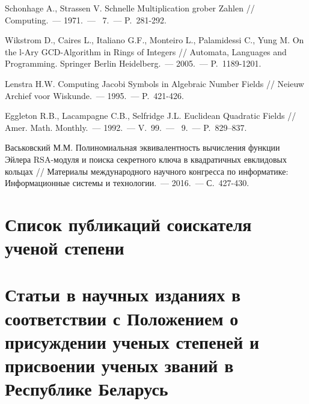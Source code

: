 \documentclass[_00_dissertation.tex]{subfiles}
\begin{document}
\begin{thebibliography}{99}
    Schonhage A., Strassen V. Schnelle Multiplication grober Zahlen // Computing.~--- 1971.~--- \textnumero~7.~--- P.~281-292.

    Wikstrom D., Caires L., Italiano G.F., Monteiro L., Palamidessi C., Yung M. On the l-Ary GCD-Algorithm in Rings of Integers // Automata, Languages and Programming. Springer Berlin Heidelberg.~--- 2005.~--- P.~1189-1201.

    Lenstra H.W. Computing Jacobi Symbols in Algebraic Number Fields // Neieuw Archief voor Wiskunde.~--- 1995.~--- P.~421-426.

    Eggleton R.B., Lacampagne C.B., Selfridge J.L. Euclidean Quadratic Fields // Amer. Math. Monthly.~--- 1992.~--- V.~99.~--- \textnumero~9.~--- P.~829--837.

    Васьковский М.М. Полиномиальная эквивалентность вычисления функции Эйлера RSA-модуля и поиска секретного ключа в квадратичных евклидовых кольцах // Материалы международного научного конгресса по информатике: Информационные системы и технологии.~--- 2016.~--- С.~427-430.

\end{thebibliography}

\newpage
\section*{Список публикаций соискателя ученой степени}

\renewcommand{\labelenumi}{\arabic{enumi}--A}
\renewcommand{\theenumi}{\arabic{enumi}--A}

\vspace{-4ex}
\section*{\fontsize{14}{15}\selectfont Статьи в научных изданиях в соответствии с Положением о присуждении ученых степеней и присвоении ученых званий в Республике Беларусь}
\vspace{-4ex}
\end{document}
